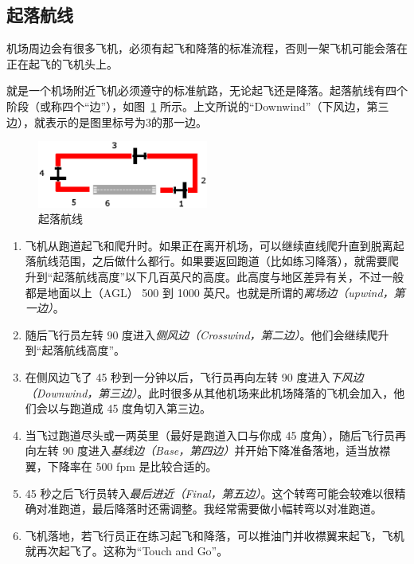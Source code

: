\subsection{起落航线}

机场周边会有很多飞机，必须有起飞和降落的标准流程，否则一架飞机可能会落在正在起飞的飞机头上。

就是一个机场附近飞机必须遵守的标准航路，无论起飞还是降落。起落航线有四个阶段（或称四个“边”），如图~\ref{pattern} 所示。上文所说的“Downwind”（下风边，第三边），就表示的是图里标号为3的那一边。

\begin{figure}[!htp]
\centering
\includegraphics[width=0.5\textwidth]{pattern}
\caption{起落航线\label{pattern}}
\end{figure}

\begin{enumerate}
\item 飞机从跑道起飞和爬升时。如果正在离开机场，可以继续直线爬升直到脱离起落航线范围，之后做什么都行。如果要返回跑道（比如练习降落），就需要爬升到“起落航线高度”以下几百英尺的高度。此高度与地区差异有关，不过一般都是地面以上（AGL） 500 到 1000 英尺。也就是所谓的\emph{离场边（upwind，第一边）}。

\item 随后飞行员左转 90 度进入\emph{侧风边（Crosswind，第二边）}。他们会继续爬升到“起落航线高度”。

\item 在侧风边飞了 45 秒到一分钟以后，飞行员再向左转 90 度进入\emph{下风边（Downwind，第三边）}。此时很多从其他机场来此机场降落的飞机会加入，他们会以与跑道成 45 度角切入第三边。

\item 当飞过跑道尽头或一两英里（最好是跑道入口与你成 45 度角），随后飞行员再向左转 90 度进入\emph{基线边（Base，第四边）}并开始下降准备落地，适当放襟翼，下降率在 500 fpm 是比较合适的。

\item 45 秒之后飞行员转入\emph{最后进近（Final，第五边）}。这个转弯可能会较难以很精确对准跑道，最后降落时还需调整。我经常需要做小幅转弯以对准跑道。

\item 飞机落地，若飞行员正在练习起飞和降落，可以推油门并收襟翼来起飞，飞机就再次起飞了。这称为“Touch and Go”。

\end{enumerate}

